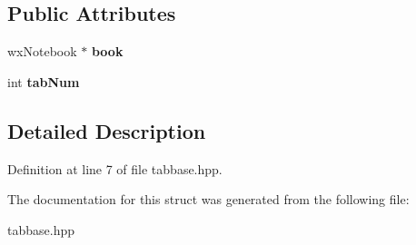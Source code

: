 \subsection*{Public Attributes}
\begin{DoxyCompactItemize}
\item 
\hypertarget{struct_tab_base_a4274555386ba73360e42ac1162deb0ee}{wx\-Notebook $\ast$ {\bfseries book}}\label{struct_tab_base_a4274555386ba73360e42ac1162deb0ee}

\item 
\hypertarget{struct_tab_base_a3c2fcafc0c5e81f7815749e24374145d}{int {\bfseries tab\-Num}}\label{struct_tab_base_a3c2fcafc0c5e81f7815749e24374145d}

\end{DoxyCompactItemize}


\subsection{Detailed Description}


Definition at line 7 of file tabbase.\-hpp.



The documentation for this struct was generated from the following file\-:\begin{DoxyCompactItemize}
\item 
tabbase.\-hpp\end{DoxyCompactItemize}
